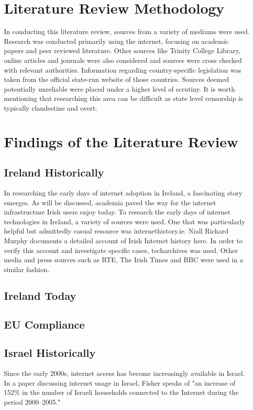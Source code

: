 \section{Literature Review Methodology}

In conducting this literature review, sources from a variety of mediums were used. Research was conducted primarily using the internet, focusing on academic papers and peer reviewed literature. Other sources like Trinity College Library, online articles and journals were also considered and sources were cross checked with relevant authorities. Information regarding country-specific legislation was taken from the official state-run website of those countries. Sources deemed potentially unreliable were placed under a higher level of scrutiny. It is worth mentioning that researching this area can be difficult as state level censorship is typically clandestine and overt. 



\section{Findings of the Literature Review}
\subsection{Ireland Historically }
In researching the early days of internet adoption in Ireland, a fascinating story emerges. As will be discussed, academia paved the way for the internet infrastructure Irish users enjoy today. To research the early days of internet technologies in Ireland, a variety of sources were used. One that was particularly helpful but admittedly casual resource was internethistory.ie. \cite{InternetHistoryIE} Niall Richard Murphy documents a detailed account of Irish Internet history here. In order to verify this account and investigate specific cases, techarchives \cite{TechArchivesIE} was used. Other media and press sources such as RTE, The Irish Times and BBC were used in a similar fashion.


\subsection{Ireland Today}


\subsection{EU Compliance}


\subsection{Israel Historically}
Since the early 2000s, internet access has become increasingly available in Israel. In a paper discussing internet usage in Israel, Fisher speaks of "an increase of 152\% in the number of Israeli households connected to the Internet during the period 2000–2005." \cite{FISHER2006984} 

